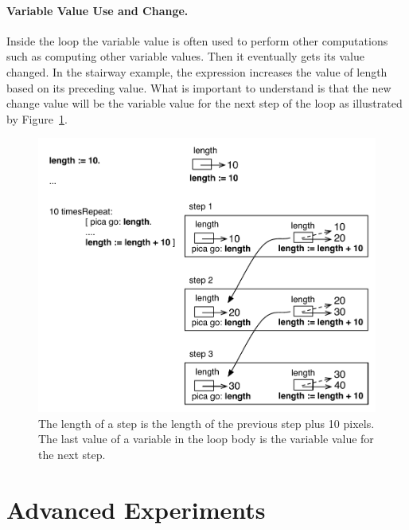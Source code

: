 \paragraph{Variable Value Use and Change.} Inside the loop the variable value is often used to perform other computations such as computing other variable values. Then it eventually gets its value changed. In the stairway example, the expression  increases the value of length based on its preceding value. What is important to understand is that the new change value will be the variable value for the next step of the loop as illustrated by Figure~\ref{fig:steppingLoop}.

\begin{figure}[h]
\begin{center}
\includegraphics[width=12cm]{steppingLoop}
\end{center}
\caption{The length of a step is the length of the previous step plus 10 pixels.
The last value of a variable in the loop body is the variable value for the next step.}
\label{fig:steppingLoop}
\end{figure}



\section{Advanced Experiments}


